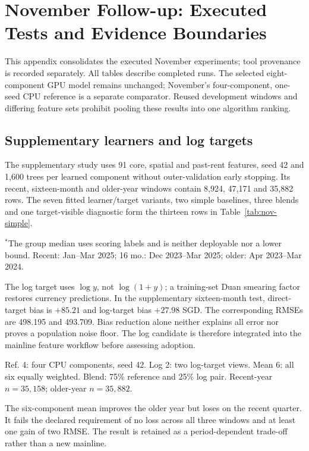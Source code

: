 \section{November Follow-up: Executed Tests and Evidence Boundaries}\label{app:november}
This appendix consolidates the executed November experiments; tool provenance is recorded separately. All tables describe completed runs. The selected eight-component GPU model remains unchanged; November's four-component, one-seed CPU reference is a separate comparator. Reused development windows and differing feature sets prohibit pooling these results into one algorithm ranking.

\subsection{Supplementary learners and log targets}
The supplementary study uses 91 core, spatial and past-rent features, seed 42 and 1,600 trees per learned component without outer-validation early stopping. Its recent, sixteen-month and older-year windows contain 8,924, 47,171 and 35,882 rows. The seven fitted learner/target variants, two simple baselines, three blends and one target-visible diagnostic form the thirteen rows in Table~\ref{tab:nov-simple}.
\begin{table}[!ht]
\caption{Supplementary feature recipe: RMSE, not the mainline recipe.}
\label{tab:nov-simple}\centering\scriptsize

\par\smallskip\raggedright\footnotesize $^{*}$The group median uses scoring labels and is neither deployable nor a lower bound. Recent: Jan--Mar 2025; 16 mo.: Dec 2023--Mar 2025; older: Apr 2023--Mar 2024.
\end{table}

The log target uses $\log y$, not $\log(1+y)$; a training-set Duan smearing factor restores currency predictions. In the supplementary sixteen-month test, direct-target bias is $+85.21$ and log-target bias $+27.98$ SGD. The corresponding RMSEs are 498.195 and 493.709. Bias reduction alone neither explains all error nor proves a population noise floor. The log candidate is therefore integrated into the mainline feature workflow before assessing adoption.
\begin{table}[!ht]
\caption{Log-target integration: RMSE under the original feature workflow.}
\label{tab:nov-log}\centering\scriptsize

\par\smallskip\raggedright\footnotesize Ref. 4: four CPU components, seed 42. Log 2: two log-target views. Mean 6: all six equally weighted. Blend: 75\% reference and 25\% log pair. Recent-year $n=35,158$; older-year $n=35,882$.
\end{table}
The six-component mean improves the older year but loses on the recent quarter. It fails the declared requirement of no loss across all three windows and at least one gain of two RMSE. The result is retained as a period-dependent trade-off rather than a new mainline.

